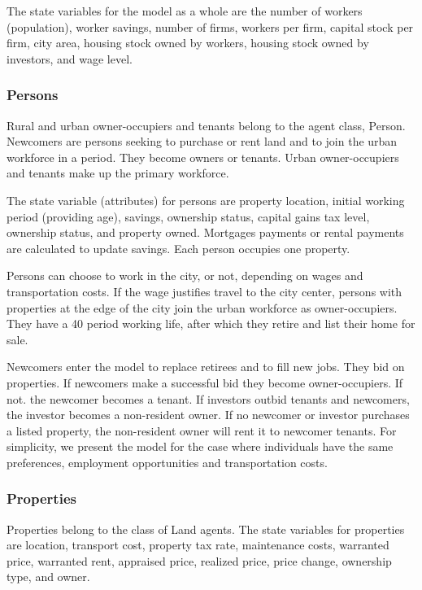 The state variables for the model as a whole are the number of workers (population),  worker savings, number of firms, workers per firm, capital stock per firm, city area, housing stock owned by workers, housing stock owned by investors, and wage level.

\subsubsection{Persons}
Rural and urban owner-occupiers and tenants belong to the agent class, Person. Newcomers are persons seeking to purchase or rent land and to join the urban workforce in a period. They become owners or tenants. Urban owner-occupiers and tenants make up the primary workforce. %

The state variable (attributes) for persons are property location, initial working period (providing age), savings, ownership status, capital gains tax level, ownership status, and property owned. Mortgages payments or rental payments are calculated to update savings. Each person occupies one property. 

Persons can choose to work in the city, or not, depending on wages and transportation costs. If the wage justifies travel to the city center, persons with properties at the edge of the city join the urban workforce as owner-occupiers. They have a 40 period working life, after which they retire and list their home for sale.   

Newcomers enter the model to replace retirees and to fill new jobs. They bid on properties. %
If newcomers make a successful bid they become owner-occupiers. If not. the newcomer becomes a tenant. If investors outbid tenants and newcomers, the investor becomes a non-resident owner.  If no newcomer or investor  purchases a listed property, the non-resident owner will rent it to newcomer tenants.  %
 For simplicity, we present the model for the case where individuals have the same preferences, employment opportunities and transportation costs.

\subsubsection{Properties}
Properties belong to the class of Land agents. The state variables for properties are location, transport cost, property tax rate, maintenance costs, warranted price, warranted rent, appraised price, realized price, price change, ownership type, and owner. 

